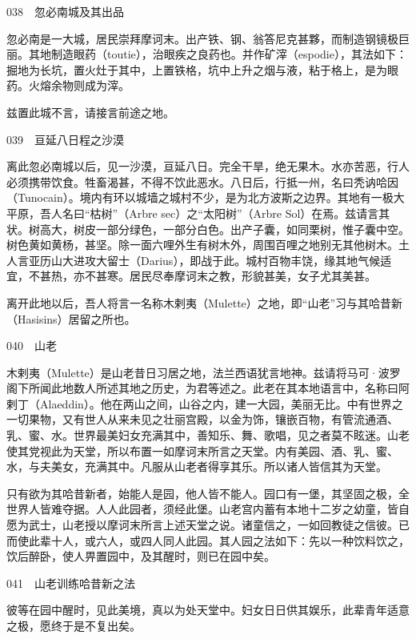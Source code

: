 \documentclass[12pt,UTF8]{ctexbook}
\begin{document}
038　忽必南城及其出品

忽必南是一大城，居民崇拜摩诃末。出产铁、钢、翁答尼克甚夥，而制造钢镜极巨丽。其地制造眼药（toutie），治眼疾之良药也。并作矿滓（espodie），其法如下：掘地为长坑，置火灶于其中，上置铁格，坑中上升之烟与液，粘于格上，是为眼药。火熔余物则成为滓。

兹置此城不言，请接言前途之地。





039　亘延八日程之沙漠

离此忽必南城以后，见一沙漠，亘延八日。完全干旱，绝无果木。水亦苦恶，行人必须携带饮食。牲畜渴甚，不得不饮此恶水。八日后，行抵一州，名曰秃讷哈因（Tunocain）。境内有环以城墙之城村不少，是为北方波斯之边界。其地有一极大平原，吾人名曰“枯树”（Arbre sec）之“太阳树”（Arbre Sol）在焉。兹请言其状。树高大，树皮一部分绿色，一部分白色。出产子囊，如同栗树，惟子囊中空。树色黄如黄杨，甚坚。除一面六哩外生有树木外，周围百哩之地别无其他树木。土人言亚历山大进攻大留士（Darius），即战于此。城村百物丰饶，缘其地气候适宜，不甚热，亦不甚寒。居民尽奉摩诃末之教，形貌甚美，女子尤其美甚。

离开此地以后，吾人将言一名称木剌夷（Mulette）之地，即“山老”习与其哈昔新（Hasisins）居留之所也。





040　山老

木剌夷（Mulette）是山老昔日习居之地，法兰西语犹言地神。兹请将马可·波罗阁下所闻此地数人所述其地之历史，为君等述之。此老在其本地语言中，名称曰阿剌丁（Alaeddin）。他在两山之间，山谷之内，建一大园，美丽无比。中有世界之一切果物，又有世人从来未见之壮丽宫殿，以金为饰，镶嵌百物，有管流通酒、乳、蜜、水。世界最美妇女充满其中，善知乐、舞、歌唱，见之者莫不眩迷。山老使其党视此为天堂，所以布置一如摩诃末所言之天堂。内有美园、酒、乳、蜜、水，与夫美女，充满其中。凡服从山老者得享其乐。所以诸人皆信其为天堂。

只有欲为其哈昔新者，始能人是园，他人皆不能人。园口有一堡，其坚固之极，全世界人皆难夺据。人人此园者，须经此堡。山老宫内蓄有本地十二岁之幼童，皆自愿为武士，山老授以摩诃末所言上述天堂之说。诸童信之，一如回教徒之信彼。已而使此辈十人，或六人，或四人同人此园。其人园之法如下：先以一种饮料饮之，饮后醉卧，使人畀置园中，及其醒时，则已在园中矣。





041　山老训练哈昔新之法

彼等在园中醒时，见此美境，真以为处天堂中。妇女日日供其娱乐，此辈青年适意之极，愿终于是不复出矣。
\end{document}
